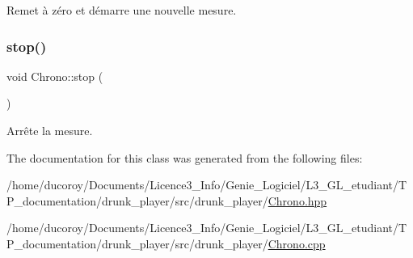 Remet à zéro et démarre une nouvelle mesure. 

\mbox{\label{classChrono_a7b8db2281381eac23da35a414077f3fd}} 
\subsubsection{\texorpdfstring{stop()}{stop()}}
{\footnotesize\ttfamily void Chrono\+::stop (\begin{DoxyParamCaption}{ }\end{DoxyParamCaption})}



Arrête la mesure. 



The documentation for this class was generated from the following files\+:\begin{DoxyCompactItemize}
\item 
/home/ducoroy/\+Documents/\+Licence3\+\_\+\+Info/\+Genie\+\_\+\+Logiciel/\+L3\+\_\+\+G\+L\+\_\+etudiant/\+T\+P\+\_\+documentation/drunk\+\_\+player/src/drunk\+\_\+player/\hyperlink{Chrono_8hpp}{Chrono.\+hpp}\item 
/home/ducoroy/\+Documents/\+Licence3\+\_\+\+Info/\+Genie\+\_\+\+Logiciel/\+L3\+\_\+\+G\+L\+\_\+etudiant/\+T\+P\+\_\+documentation/drunk\+\_\+player/src/drunk\+\_\+player/\hyperlink{Chrono_8cpp}{Chrono.\+cpp}\end{DoxyCompactItemize}
